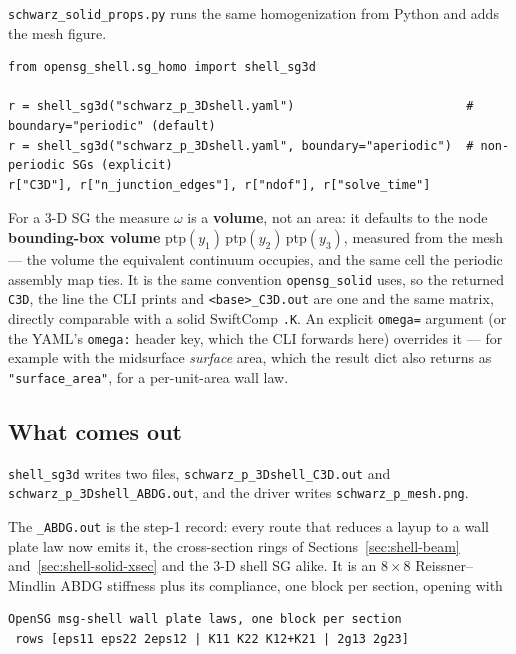 \noindent
\texttt{schwarz\_solid\_props.py} runs the same homogenization from Python and
adds the mesh figure.

\begin{lstlisting}[style=opensg,caption={The two boundary treatments of shell\_sg3d.},basicstyle=\ttfamily\scriptsize]
from opensg_shell.sg_homo import shell_sg3d

r = shell_sg3d("schwarz_p_3Dshell.yaml")                        # boundary="periodic" (default)
r = shell_sg3d("schwarz_p_3Dshell.yaml", boundary="aperiodic")  # non-periodic SGs (explicit)
r["C3D"], r["n_junction_edges"], r["ndof"], r["solve_time"]
\end{lstlisting}

For a 3-D SG the measure $\omega$ is a \textbf{volume}, not an area: it defaults
to the node \textbf{bounding-box volume}
$\mathrm{ptp}(y_1)\,\mathrm{ptp}(y_2)\,\mathrm{ptp}(y_3)$, measured from the
mesh --- the volume the equivalent continuum occupies, and the same cell the
periodic assembly map ties. It is the same convention \texttt{opensg\_solid}
uses, so the returned \texttt{C3D}, the line the CLI prints and
\texttt{<base>\_C3D.out} are one and the same matrix, directly comparable with a
solid SwiftComp \texttt{.K}. An explicit \texttt{omega=} argument (or the YAML's
\texttt{omega:} header key, which the CLI forwards here) overrides it --- for
example with the midsurface \emph{surface} area, which the result dict also
returns as \texttt{"surface\_area"}, for a per-unit-area wall law.

\subsection{What comes out}

\texttt{shell\_sg3d} writes two files, \texttt{schwarz\_p\_3Dshell\_C3D.out} and
\texttt{schwarz\_p\_3Dshell\_ABDG.out}, and the driver writes
\texttt{schwarz\_p\_mesh.png}.

The \texttt{\_ABDG.out} is the step-1 record: every route that reduces a layup
to a wall plate law now emits it, the cross-section rings of
Sections~\ref{sec:shell-beam} and~\ref{sec:shell-solid-xsec} and the 3-D shell
SG alike. It is an $8\times8$ Reissner--Mindlin ABDG stiffness plus its
compliance, one block per section, opening with

\begin{Verbatim}[fontsize=\small,frame=single,framesep=4pt]
 OpenSG msg-shell wall plate laws, one block per section
 rows [eps11 eps22 2eps12 | K11 K22 K12+K21 | 2g13 2g23]
\end{Verbatim}

